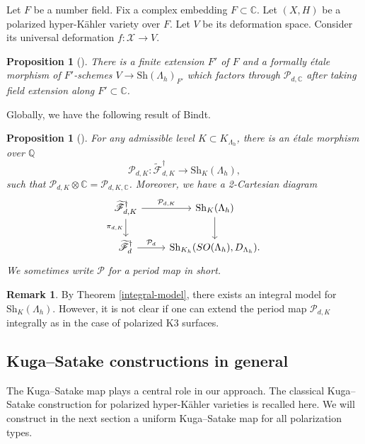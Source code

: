 \documentclass[11pt,reqno,oneside]{amsart}
\numberwithin{equation}{section}
\newtheorem{proposition}[theorem]{Proposition}
\theoremstyle{definition}
\newtheorem{remark}[theorem]{Remark}
\newcommand{\SO}{{\rm SO}}
\newcommand{\Sh}{\mathrm{Sh}}
\newcommand{\scF}{\mathscr{F}}
\newcommand{\CC}{\mathbb{C}}
\newcommand{\QQ}{\mathbb{Q}}
\begin{document}
 Let $F$ be a number field. Fix a complex embedding $F \subset \CC$. Let $(X,H)$ be a polarized hyper-Kähler variety over $F$. Let $V$ be its deformation space. Consider its universal deformation $f \colon \mathcal{X} \to V$. 
\begin{proposition}[{\cite[Proposition 16]{Ch13}}]\label{prop:localTorelli}
There is a finite extension $F'$ of $F$ and a formally \'etale morphism of $F'$-schemes $ V \to \Sh(\Lambda_{h})_{F'}$ which factors through $\mathcal{P}_{d,\CC}$ after taking field extension along $F' \subset \CC$.
\end{proposition}


Globally, we have the following result of Bindt. 
\begin{proposition}[{\cite[Theorem 4.5.2]{BindtThesis}}]
\label{prop:descentperiod}
For any  admissible level $K \subset K_{\Lambda_h}$, there is an \'etale morphism over $\QQ$
\[
 \mathcal{P}_{d, K}\colon \widetilde{\scF}_{d,K}^{\dag} \to \Sh_{K}(\Lambda_h),
\]
such that $\mathcal{P}_{d,K} \otimes \CC = \mathcal{P}_{d,K,\CC}$. Moreover, we have a 2-Cartesian diagram
\begin{equation}
\begin{tikzcd}\label{eq:cartisianlevel}
 \widetilde{\scF}_{d,K}^{\dag} \ar[r,"\mathcal{P}_{d, K} "] \ar[d, "\pi_{d,K}"'] & \Sh_{K}(\Lambda_h) \ar[d] \\
 \widetilde{\scF}_{d}^{\dag} \ar[r,"\mathcal{P}_{d}"] &\Sh_{K_h}(\SO(\Lambda_h), D_{\Lambda_h}) .
\end{tikzcd}
\end{equation}
We sometimes write $\mathcal{P}$ for a period map in short.
\end{proposition}

\begin{remark} By Theorem \ref{integral-model}, there exists an integral model for $\Sh_K(\Lambda_h)$. 
However, it is not clear if one  can extend the period map $\mathcal{P}_{d,K}$ integrally as in the case of polarized K3 surfaces.
\end{remark}

\subsection{Kuga--Satake constructions in general}
\label{subsec:KS}
The Kuga--Satake map plays a central role in our approach. The classical Kuga--Satake construction for polarized hyper-Kähler varieties is recalled here. We will construct in the next section a uniform Kuga--Satake map for all polarization types. 
\end{document}
